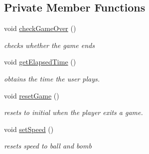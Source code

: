 \subsection*{Private Member Functions}
\begin{DoxyCompactItemize}
\item 
void \hyperlink{classstart_game_1_1_game_controller_a3e2fb04603f5a7482672b3b5d1afe568}{check\+Game\+Over} ()
\begin{DoxyCompactList}\small\item\em checks whether the game ends \end{DoxyCompactList}\item 
void \hyperlink{classstart_game_1_1_game_controller_a8b653d5dc322ed45691f1b50dcb16b05}{get\+Elapsed\+Time} ()
\begin{DoxyCompactList}\small\item\em obtains the time the user plays. \end{DoxyCompactList}\item 
void \hyperlink{classstart_game_1_1_game_controller_a2248f03e8a73083a57b10d4faec5797c}{reset\+Game} ()
\begin{DoxyCompactList}\small\item\em resets to initial when the player exits a game. \end{DoxyCompactList}\item 
void \hyperlink{classstart_game_1_1_game_controller_a115fe144ac38f1b8d7e6be4d5bbb23f4}{set\+Speed} ()
\begin{DoxyCompactList}\small\item\em resets speed to ball and bomb \end{DoxyCompactList}\end{DoxyCompactItemize}
